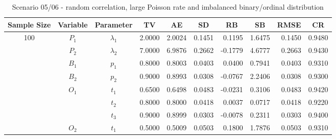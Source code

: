\documentclass[letterpaper]{article}
\begin{document}
\begin{table}[h]
\centering
\caption{Scenario 05/06 - random correlation, large Poisson rate and imbalanced binary/ordinal distribution}
\begin{tabular}{cccrrrrrrr}
\hline
Sample Size & Variable    & Parameter      & \multicolumn{1}{c}{TV} & \multicolumn{1}{c}{AE} & \multicolumn{1}{c}{SD} & \multicolumn{1}{c}{RB} & \multicolumn{1}{c}{SB} & \multicolumn{1}{c}{RMSE} & \multicolumn{1}{c}{CR} \\ \hline
100         & $P_1$       & $\lambda_1$    & 2.0000                 & 2.0024                 & 0.1451                 & 0.1195                 & 1.6475                 & 0.1450                   & 0.9480                 \\
            & $P_2$       & $\lambda_2$    & 7.0000                 & 6.9876                 & 0.2662                 & -0.1779                & 4.6777                 & 0.2663                   & 0.9430                 \\
            & $B_1$       & $p_1$          & 0.8000                 & 0.8003                 & 0.0403                 & 0.0400                 & 0.7941                 & 0.0403                   & 0.9310                 \\
            & $B_2$       & $p_2$          & 0.9000                 & 0.8993                 & 0.0308                 & -0.0767                & 2.2406                 & 0.0308                   & 0.9300                 \\
            & $O_1$       & $t_1$          & 0.6500                 & 0.6498                 & 0.0483                 & -0.0231                & 0.3106                 & 0.0483                   & 0.9420                 \\
            &             & $t_2$          & 0.8000                 & 0.8000                 & 0.0418                 & 0.0037                 & 0.0717                 & 0.0418                   & 0.9220                 \\
            &             & $t_3$          & 0.9000                 & 0.8999                 & 0.0303                 & -0.0078                & 0.2311                 & 0.0303                   & 0.9400                 \\
            & $O_2$       & $t_1$          & 0.5000                 & 0.5009                 & 0.0503                 & 0.1800                 & 1.7876                 & 0.0503                   & 0.9310                 \\

\end{tabular}
\end{table}
\end{document}
